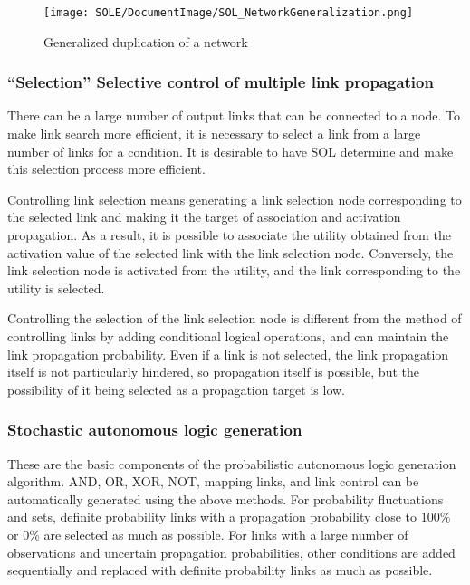 \documentclass[12pt]{article}
\begin{document}
\begin{figure}[ht]
  \centering
  \texttt{[image: SOLE/DocumentImage/SOL\_NetworkGeneralization.png]}
  \caption{Generalized duplication of a network}
  \label{fig:generalized_duplication_of_a_network}
\end{figure}

\subsubsection{``Selection'' Selective control of multiple link
propagation}\label{selection-selective-control-of-multiple-link-propagation}

There can be a large number of output links that can be connected to a
node. To make link search more efficient, it is necessary to select a
link from a large number of links for a condition. It is desirable to
have SOL determine and make this selection process more efficient.

Controlling link selection means generating a link selection node
corresponding to the selected link and making it the target of
association and activation propagation. As a result, it is possible to
associate the utility obtained from the activation value of the selected
link with the link selection node. Conversely, the link selection node
is activated from the utility, and the link corresponding to the utility
is selected.

Controlling the selection of the link selection node is different from
the method of controlling links by adding conditional logical
operations, and can maintain the link propagation probability. Even if a
link is not selected, the link propagation itself is not particularly
hindered, so propagation itself is possible, but the possibility of it
being selected as a propagation target is low.

\subsubsection{Stochastic autonomous logic
generation}\label{stochastic-autonomous-logic-generation}

These are the basic components of the probabilistic autonomous logic
generation algorithm. AND, OR, XOR, NOT, mapping links, and link control
can be automatically generated using the above methods. For probability
fluctuations and sets, definite probability links with a propagation
probability close to 100\% or 0\% are selected as much as possible. For
links with a large number of observations and uncertain propagation
probabilities, other conditions are added sequentially and replaced with
definite probability links as much as possible.
\end{document}
